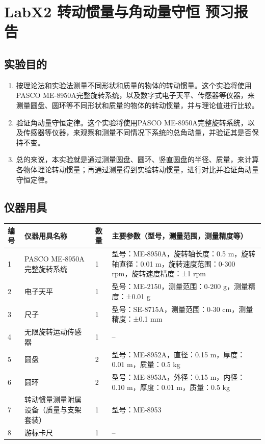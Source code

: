 \documentclass[dvipsnames, svgnames,a4paper,11pt]{article}
\begin{document}
	
	
	\setcounter{section}{0}
	\section{LabX2 转动惯量与角动量守恒 \quad\heiti 预习报告}
	
	\subsection{实验目的}
	\begin{enumerate}
		\item 按理论法和实验法测量不同形状和质量的物体的转动惯量。这个实验将使用PASCO ME-8950A完整旋转系统，以及数字式电子天平、传感器等仪器，来测量圆盘、圆环等不同形状和质量的物体的转动惯量，并与理论值进行比较。
		\item 验证角动量守恒定律。这个实验将使用PASCO ME-8950A完整旋转系统，以及传感器等仪器，来观察和测量不同情况下系统的总角动量，并验证其是否保持不变。
		\item 总的来说，本实验就是通过测量圆盘、圆环、竖直圆盘的半径、质量，来计算各物体理论转动惯量；再通过测量得到实验转动惯量，进行对比并验证角动量守恒定律。
	\end{enumerate}
	
	\subsection{仪器用具}
	\begin{table}[htbp]
		\centering
		\renewcommand\arraystretch{1.6}
		\begin{tabular}{p{}|p{}|p{}|p{}}
			\hline
			编号& 仪器用具名称 & 数量 &  主要参数（型号，测量范围，测量精度等） \\
			\hline
			1& PASCO ME-8950A 完整旋转系统 & 1 & 型号：ME-8950A，旋转轴长度：0.5 m，旋转轴直径：0.01 m，旋转速度范围：0-300 rpm，旋转速度精度：±1 rpm \\
			
			2& 	电子天平 & 1 & 型号：ME-2150，测量范围：0-200 g，测量精度：±0.01 g \\
			
			3& 尺子 & 1 & 型号：SE-8715A，测量范围：0-30 cm，测量精度：±0.1 mm \\
			
			4& 无限旋转运动传感器 & 1 & -- \\
			
			5& 圆盘 & 2 & 型号：ME-8952A，直径：0.15 m，厚度：0.01 m，质量：0.5 kg \\
			
			6& 圆环 & 2 & 型号：ME-8953A，外径：0.15 m，内径：0.10 m，厚度：0.01 m，质量：0.5 kg \\
			
			7& 转动惯量测量附属设备（质量与支架套装） & 1 & 型号：ME-8953 \\
			
			8& 游标卡尺 & 1 & -- \\
			\hline
		\end{tabular}
	\end{table}
	
\end{document}
